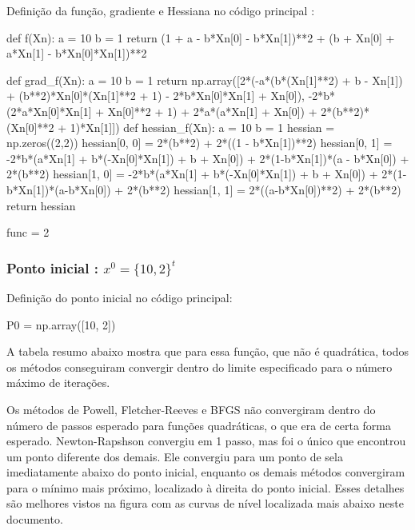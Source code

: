 \documentclass[10pt, a4paper]{article}
\begin{document}
\vspace{5mm}

Definição da função, gradiente e Hessiana no código principal :

\begin{python}
  def f(Xn):
    a = 10
    b = 1
    return (1 + a - b*Xn[0] - b*Xn[1])**2 + (b + Xn[0] + a*Xn[1] - b*Xn[0]*Xn[1])**2 
    
  def grad_f(Xn):
      a = 10
      b = 1
      return np.array([2*(-a*(b*(Xn[1]**2) + b - Xn[1]) + (b**2)*Xn[0]*(Xn[1]**2 + 1) - 2*b*Xn[0]*Xn[1] + Xn[0]),
                      -2*b*(2*a*Xn[0]*Xn[1] + Xn[0]**2 + 1) + 2*a*(a*Xn[1] + Xn[0]) + 2*(b**2)*(Xn[0]**2 + 1)*Xn[1]])
  def hessian_f(Xn):
      a = 10
      b = 1
      hessian = np.zeros((2,2))
      hessian[0, 0] = 2*(b**2) + 2*((1 - b*Xn[1])**2)
      hessian[0, 1] = -2*b*(a*Xn[1] + b*(-Xn[0]*Xn[1]) + b + Xn[0]) + 2*(1-b*Xn[1])*(a - b*Xn[0]) + 2*(b**2)
      hessian[1, 0] = -2*b*(a*Xn[1] + b*(-Xn[0]*Xn[1]) + b + Xn[0]) + 2*(1-b*Xn[1])*(a-b*Xn[0]) + 2*(b**2)
      hessian[1, 1] = 2*((a-b*Xn[0])**2) + 2*(b**2)
      return hessian
      
  func = 2
\end{python}

\subsubsection{Ponto inicial : $x^0 = \{10,2\}^t $}

Definição do ponto inicial no código principal:
\begin{python}
  P0 = np.array([10, 2])
\end{python}

A tabela resumo abaixo mostra que para essa função, que não é quadrática, todos os métodos conseguiram convergir dentro
do limite especificado para o número máximo de iterações.

Os métodos de Powell, Fletcher-Reeves e BFGS não convergiram dentro
do número de passos esperado para funções quadráticas, o que era de certa forma esperado.  Newton-Rapshson convergiu em
1 passo, mas foi o único que encontrou um ponto diferente dos demais. Ele convergiu para um ponto de sela imediatamente
abaixo do ponto inicial, enquanto os demais métodos convergiram para o mínimo mais próximo, localizado à direita
do ponto inicial. Esses detalhes são melhores vistos na figura com as curvas de nível localizada mais abaixo neste documento.
\end{document}
